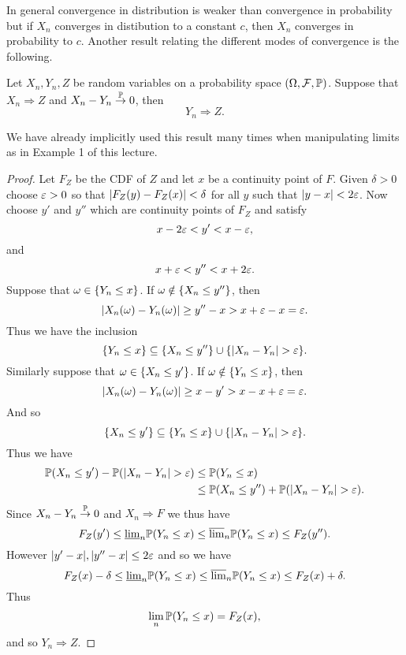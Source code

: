 In general convergence in distribution is weaker than convergence in probability but if $X_n$ converges in distibution to a constant $c$, then $X_n$ converges in probability to $c$. Another result relating the different modes of convergence is the following.
\begin{thrm}[Slutsky]
    Let $X_n, Y_n, Z$ be random variables on a probability space $({{\Omega}},{\mathcal{F}},{\mathbb{P}})$. Suppose that $X_n \Rightarrow Z$ and $X_n - Y_n \stackrel{{\mathbb{P}}}{\to} 0$, then
    \[Y_n \Rightarrow Z. \]
\end{thrm}
We have already implicitly used this result many times when manipulating limits as in Example 1 of this lecture.
\begin{proof}
    Let $F_Z$ be the CDF of $Z$ and let $x$ be a continuity point of $F$. Given $\delta > 0$ choose $\varepsilon > 0$ so that ${\left\lvert F_Z(y)-F_Z(x)\right\rvert} < \delta$ for all $y$ such that ${\left\lvert y-x\right\rvert} < 2\varepsilon$. Now choose $y'$ and $y''$ which are continuity points of $F_Z$ and satisfy
    \[x-2\varepsilon < y' < x-\varepsilon,\] 
    and \[x+\varepsilon < y'' < x+2\varepsilon. \]
    Suppose that ${\omega} \in \{Y_n \le x\}$. If ${\omega} \notin \{X_n \le y''\}$, then 
    \[{\left\lvert X_n({\omega}) - Y_n({\omega})\right\rvert} \ge y'' - x > x+\varepsilon - x=\varepsilon. \]
    Thus we have the inclusion 
    \[\{Y_n \le x\} \subseteq \{X_n \le y''\} \cup \{{\left\lvert X_n-Y_n\right\rvert} > \varepsilon \}. \]
    Similarly suppose that ${\omega} \in \{X_n \le y'\}$. If ${\omega} \notin \{Y_n \le x\}$, then 
    \[{\left\lvert X_n({\omega})-Y_n({\omega})\right\rvert} \ge x-y' > x-x+\varepsilon =\varepsilon. \]
    And so 
    \[\{X_n \le y' \} \subseteq \{Y_n \le x\} \cup \{{\left\lvert X_n - Y_n\right\rvert} > \varepsilon\}. \]
    Thus we have
    \begin{align*}
        {\mathbb{P}}(X_n \le y') -{\mathbb{P}}({\left\lvert X_n-Y_n\right\rvert}  > \varepsilon)& \le {\mathbb{P}}(Y_n \le x)\\
        &\le {\mathbb{P}}(X_n \le y'') + {\mathbb{P}}({\left\lvert X_n - Y_n\right\rvert} > \varepsilon).
    \end{align*}
    Since $X_n - Y_n \stackrel{{\mathbb{P}}}{\to} 0$ and $X_n \Rightarrow F$ we  thus have 
    \[F_Z(y') \le \underline{\lim}_n {\mathbb{P}}(Y_n \le x) \le \overline{\lim}_n {\mathbb{P}}(Y_n \le x) \le F_Z(y''). \]
    However ${\left\lvert y'-x\right\rvert},{\left\lvert y''-x\right\rvert} \le 2\varepsilon$ and so we have 
    \[F_Z(x)-\delta \le \underline{\lim}_n {\mathbb{P}}(Y_n \le x) \le \overline{\lim}_n {\mathbb{P}}(Y_n \le x) \le F_Z(x)+\delta. \]
    Thus 
    \[ \lim_n {\mathbb{P}}(Y_n \le x) = F_Z(x),\]
    and so $Y_n \Rightarrow Z$.
\end{proof}
